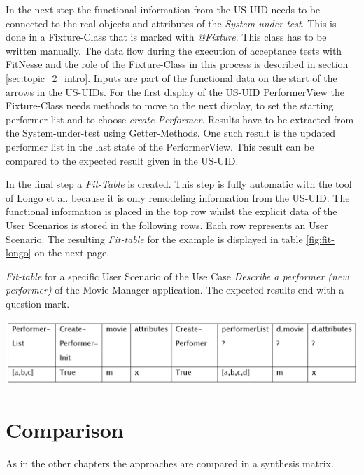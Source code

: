 In the next step the functional information from the US-UID needs to be connected to the real
objects and attributes of the \textit{System-under-test}. This is done in a Fixture-Class that is marked
with \textit{@Fixture}.
This class has to be written manually.
The data flow during the execution of acceptance tests with FitNesse and the role of the Fixture-Class in this process is described in section \ref{sec:topic_2_intro}.
Inputs are part of the functional data on the start of the arrows in the US-UIDs. 
For the first display of the US-UID PerformerView the Fixture-Class needs methods to move to the next display, to set the starting performer list and to choose
\textit{create Performer}.
Results have to be extracted from the System-under-test using Getter-Methods.
One such result is the updated performer list in the last state of the PerformerView.
This result can be compared to the expected result given in the US-UID.

In the final step a \textit{Fit-Table} is created.
This step is fully automatic with the tool of Longo et al. because it is only remodeling information from the US-UID.
The functional information is placed in the top row whilst the explicit data of the User Scenarios is stored in the following rows.
Each row represents an User Scenario.
The resulting \textit{Fit-table} for the example is displayed in table \ref{fig:fit-longo} on the next page.

\begin{table}[h!]
	\caption{\textit{Fit-table} for a specific User Scenario of the Use Case \textit{Describe a performer (new performer)} of the Movie Manager application. The expected results end with a question mark.}
	\centering
	\includegraphics[width=\textwidth]{../images/LongoFit.png}

	
	\label{fig:fit-longo}
\end{table}

\newpage
\section{Comparison}
\label{sec:comparison}

As in the other chapters the approaches are compared in a synthesis matrix.

